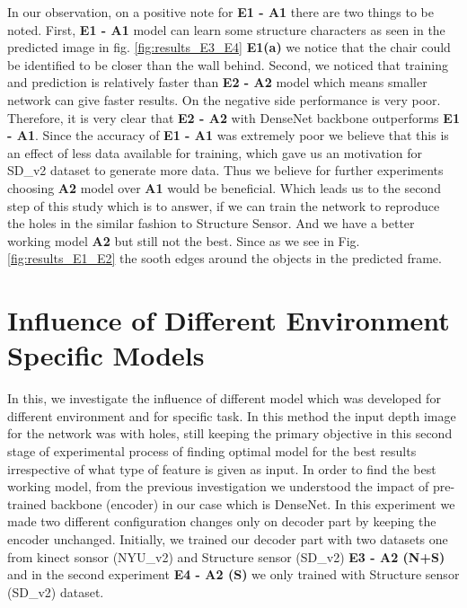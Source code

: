 In our observation, on a positive note for \textbf{E1 - A1} there are two things to be noted. First,  \textbf{E1 - A1} model can learn some structure characters as seen in the predicted image in fig. \ref{fig:results_E3_E4} \textbf{E1(a)} we notice that the chair could be identified to be closer than the wall behind. Second, we noticed that training and prediction is relatively  faster than \textbf{E2 - A2} model which means smaller network can give faster results. On the negative  side performance is very poor. 
Therefore, it is very clear that \textbf{E2 - A2} with DenseNet backbone outperforms \textbf{E1 - A1}. Since the accuracy of \textbf{E1 - A1} was extremely poor we believe that this is an effect of less data available for training, which gave us an motivation for SD\_v2  dataset to generate more data. Thus we believe for further experiments choosing \textbf{A2} model over \textbf{A1} would be beneficial. Which leads us to the second step of this study which is to answer, if we can train the network to reproduce the holes in the similar fashion to Structure Sensor. And we have a better working model \textbf{A2} but still not the best. Since as we see in Fig. \ref{fig:results_E1_E2} the sooth edges around the objects in the predicted frame. 
 


 

 \section{Influence of Different Environment Specific Models}
 \label{Chapter6:Transfer_Learning}
In this, we investigate the influence of different model which was developed for different environment and for specific task. In this method the input depth image for the network was with holes, still keeping the primary objective in this second stage of experimental process of finding optimal model for the best results irrespective of what type of feature is given as input. In order to find the best working model, from the previous investigation we understood the impact of pre-trained backbone (encoder) in our case which is DenseNet. In this experiment we made two different configuration changes only on decoder part by keeping the encoder unchanged. Initially, we trained our decoder part with two datasets one from kinect sonsor (NYU\_v2) and Structure sensor (SD\_v2) \textbf{E3 - A2 (N+S)} and in the second experiment \textbf{E4 - A2 (S)} we only trained with Structure sensor (SD\_v2) dataset. 

